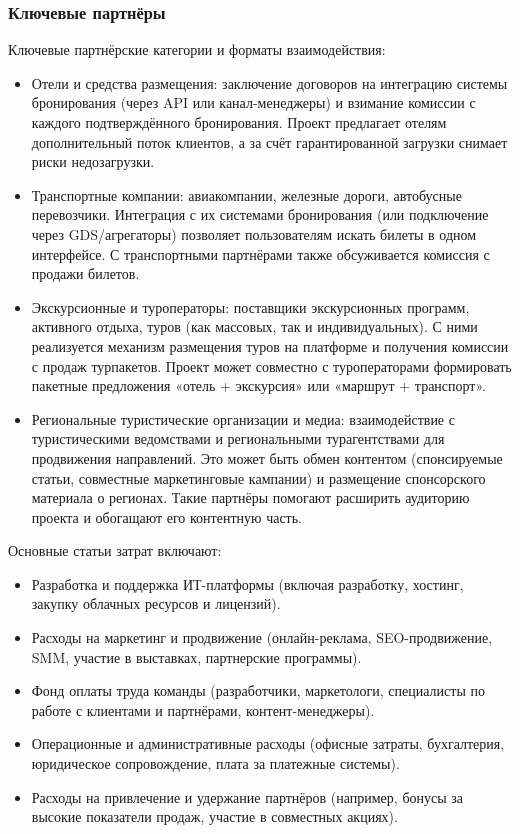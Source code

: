 \subsubsection*{Ключевые партнёры}
Ключевые партнёрские категории и форматы взаимодействия:
\begin{itemize}
    \item Отели и средства размещения: заключение договоров на интеграцию системы бронирования (через API или канал-менеджеры) и взимание комиссии с каждого подтверждённого бронирования. Проект предлагает отелям дополнительный поток клиентов, а за счёт гарантированной загрузки снимает риски недозагрузки.
    \item Транспортные компании: авиакомпании, железные дороги, автобусные перевозчики. Интеграция с их системами бронирования (или подключение через GDS/агрегаторы) позволяет пользователям искать билеты в одном интерфейсе. С транспортными партнёрами также обсуживается комиссия с продажи билетов.
    \item Экскурсионные и туроператоры: поставщики экскурсионных программ, активного отдыха, туров (как массовых, так и индивидуальных). С ними реализуется механизм размещения туров на платформе и получения комиссии с продаж турпакетов. Проект может совместно с туроператорами формировать пакетные предложения «отель + экскурсия» или «маршрут + транспорт».
    \item Региональные туристические организации и медиа: взаимодействие с туристическими ведомствами и региональными турагентствами для продвижения направлений. Это может быть обмен контентом (спонсируемые статьи, совместные маркетинговые кампании) и размещение спонсорского материала о регионах. Такие партнёры помогают расширить аудиторию проекта и обогащают его контентную часть.
\end{itemize}

Основные статьи затрат включают:
\begin{itemize}
    \item Разработка и поддержка ИТ-платформы (включая разработку, хостинг, закупку облачных ресурсов и лицензий).
    \item Расходы на маркетинг и продвижение (онлайн-реклама, SEO-продвижение, SMM, участие в выставках, партнерские программы).
    \item Фонд оплаты труда команды (разработчики, маркетологи, специалисты по работе с клиентами и партнёрами, контент-менеджеры).
    \item Операционные и административные расходы (офисные затраты, бухгалтерия, юридическое сопровождение, плата за платежные системы).
    \item Расходы на привлечение и удержание партнёров (например, бонусы за высокие показатели продаж, участие в совместных акциях).
\end{itemize}

